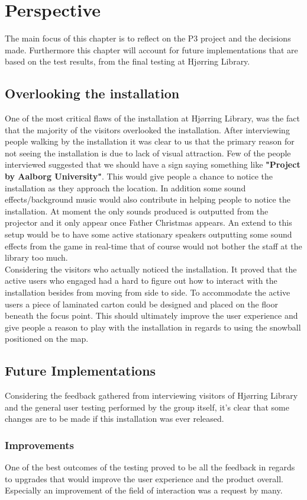 \chapter{Perspective}
The main focus of this chapter is to reflect on the P3 project and the decisions made. Furthermore this chapter will account for future implementations that are based on the test results, from the final testing at Hj{\o}rring Library.
\section{Overlooking the installation}
One of the most critical flaws of the installation at Hj{\o}rring Library, was the fact that the majority of the visitors overlooked the installation. After interviewing people walking by the installation it was clear to us that the primary reason for not seeing the installation is due to lack of visual attraction. Few of the people interviewed suggested that we should have a sign saying something like \textbf{"Project by Aalborg University"}. This would give people a chance to notice the installation as they approach the location. In addition some sound effects/background music would also contribute in helping people to notice the installation. At moment the only sounds produced is outputted from the projector and it only appear once Father Christmas appears. An extend to this setup would be to have some active stationary speakers outputting some sound effects from the game in real-time that of course would not bother the staff at the library too much.\\
Considering the visitors who actually noticed the installation. It proved that the active users who engaged had a hard to figure out how to interact with the installation besides from moving from side to side. To accommodate the active users a piece of laminated carton could be designed and placed on the floor beneath the focus point. This should ultimately improve the user experience and give people a reason to play with the installation in regards to using the snowball positioned on the map.\\
\section{Future Implementations}
Considering the feedback gathered from interviewing visitors of Hj{\o}rring Library and the general user testing performed by the group itself, it's clear that some changes are to be made if this installation was ever released.
\subsection{Improvements}
One of the best outcomes of the testing proved to be all the feedback in regards to upgrades that would improve the user experience and the product overall. Especially an improvement of the field of interaction was a request by many.  
